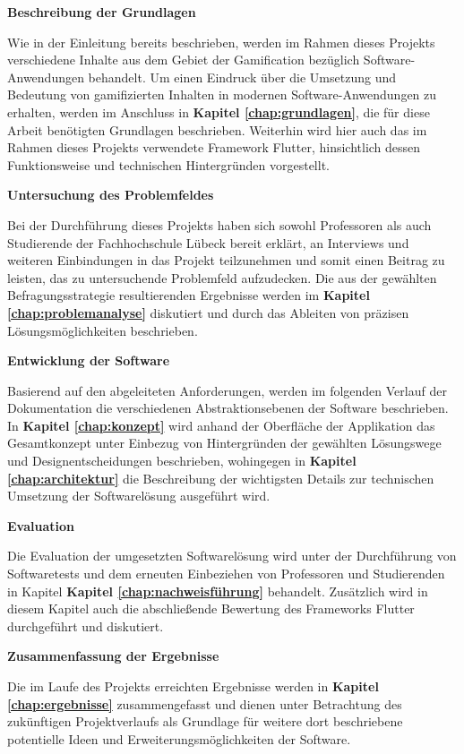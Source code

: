 \documentclass[bibliography=totoc,listof=totoc,BCOR=5mm,DIV=12,oneside]{scrbook}
\begin{document}
\par \bigskip \textbf{Beschreibung der Grundlagen}
\par Wie in der Einleitung bereits beschrieben, werden im Rahmen dieses Projekts verschiedene Inhalte aus dem Gebiet der Gamification bezüglich Software-Anwendungen behandelt. Um einen Eindruck über die Umsetzung und Bedeutung von gamifizierten Inhalten in modernen Software-Anwendungen zu erhalten, werden im Anschluss in \textbf{Kapitel \ref{chap:grundlagen}}, die für diese Arbeit benötigten Grundlagen beschrieben. Weiterhin wird hier auch das im Rahmen dieses Projekts verwendete Framework Flutter, hinsichtlich dessen Funktionsweise und technischen Hintergründen vorgestellt.

\par \bigskip \textbf{Untersuchung des Problemfeldes}
\par Bei der Durchführung dieses Projekts haben sich sowohl Professoren als auch Studierende der Fachhochschule Lübeck bereit erklärt, an Interviews und weiteren Einbindungen in das Projekt teilzunehmen und somit einen Beitrag zu leisten, das zu untersuchende Problemfeld aufzudecken. Die aus der gewählten Befragungsstrategie resultierenden Ergebnisse werden im \textbf{Kapitel \ref{chap:problemanalyse}} diskutiert und durch das Ableiten von präzisen Lösungsmöglichkeiten beschrieben.

\par \bigskip \textbf{Entwicklung der Software}
\par Basierend auf den abgeleiteten Anforderungen, werden im folgenden Verlauf der Dokumentation die verschiedenen Abstraktionsebenen der Software beschrieben. In \textbf{Kapitel \ref{chap:konzept}} wird anhand der Oberfläche der Applikation das Gesamtkonzept unter Einbezug von Hintergründen der gewählten Lösungswege und Designentscheidungen beschrieben, wohingegen in \textbf{Kapitel \ref{chap:architektur}} die Beschreibung der wichtigsten Details zur technischen Umsetzung der Softwarelösung ausgeführt wird.

\par \bigskip \textbf{Evaluation}
\par Die Evaluation der umgesetzten Softwarelösung wird unter der Durchführung von Softwaretests und dem erneuten Einbeziehen von Professoren und Studierenden in Kapitel \textbf{Kapitel \ref{chap:nachweisführung}} behandelt. Zusätzlich wird in diesem Kapitel auch die abschließende Bewertung des Frameworks Flutter durchgeführt und diskutiert.

\par \bigskip \textbf{Zusammenfassung der Ergebnisse}
\par Die im Laufe des Projekts erreichten Ergebnisse werden in \textbf{Kapitel \ref{chap:ergebnisse}} zusammengefasst und dienen unter Betrachtung des zukünftigen Projektverlaufs als Grundlage für weitere dort beschriebene potentielle Ideen und Erweiterungsmöglichkeiten der Software.
\end{document}
